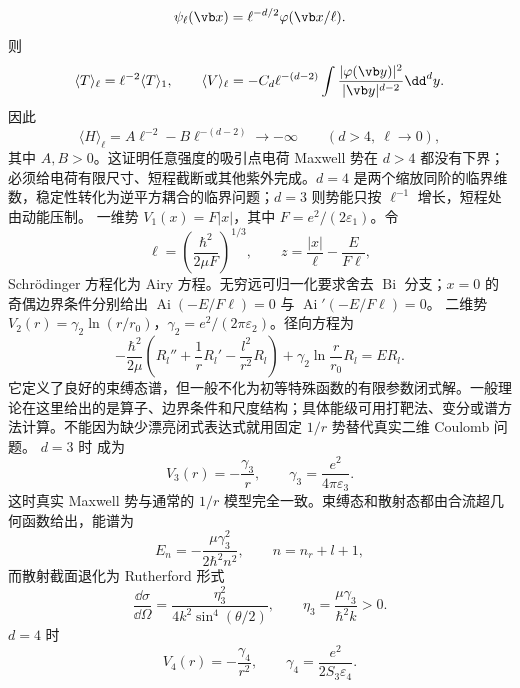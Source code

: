 \[
\psi_\ell(\vb x)=\ell^{-d/2}\varphi(\vb x/\ell).
\]
则
\[
\langle T\rangle_{\ell}=\ell^{-2}\langle T\rangle_1,
\qquad
\langle V\rangle_{\ell}=-C_d\ell^{-(d-2)}
\int\frac{|\varphi(\vb y)|^2}{|\vb y|^{d-2}}\dd^dy.
\]
因此
\begin{equation}
\langle H\rangle_\ell
=A\ell^{-2}-B\ell^{-(d-2)}\longrightarrow-\infty
\qquad(d>4,\ \ell\to0),
\label{eq:phys-hdqm-maxwell-collapse-dgt4}
\end{equation}
其中 $A,B>0$。这证明任意强度的吸引点电荷 Maxwell 势在 $d>4$ 都没有下界；必须给电荷有限尺寸、短程截断或其他紫外完成。$d=4$ 是两个缩放同阶的临界维数，稳定性转化为逆平方耦合的临界问题；$d=3$ 则势能只按 $\ell^{-1}$ 增长，短程处由动能压制。
一维势 $V_1(x)=F|x|$，其中 $F=e^2/(2\varepsilon_1)$。令
\[
 \ell=\left(\frac{\hbar^2}{2\mu F}\right)^{1/3},\qquad
 z=\frac{|x|}{\ell}-\frac{E}{F\ell},
\]
Schrödinger 方程化为 Airy 方程。无穷远可归一化要求舍去 $\operatorname{Bi}$ 分支；$x=0$ 的奇偶边界条件分别给出 $\operatorname{Ai}(-E/F\ell)=0$ 与 $\operatorname{Ai}'(-E/F\ell)=0$。
二维势 $V_2(r)=\gamma_2\ln(r/r_0)$，$\gamma_2=e^2/(2\pi\varepsilon_2)$。径向方程为
\begin{equation}\label{eq:phys-hdqm-d2-log-radial}
 -\frac{\hbar^2}{2\mu}\left(R_l''+\frac1rR_l'-\frac{l^2}{r^2}R_l\right)
 +\gamma_2\ln\frac r{r_0}R_l=ER_l.
\end{equation}
它定义了良好的束缚态谱，但一般不化为初等特殊函数的有限参数闭式解。一般理论在这里给出的是算子、边界条件和尺度结构；具体能级可用打靶法、变分或谱方法计算。不能因为缺少漂亮闭式表达式就用固定 $1/r$ 势替代真实二维 Coulomb 问题。
$d=3$ 时 成为
\begin{equation}\label{eq:phys-hdqm-coulomb-3d}
 V_3(r)=-\frac{\gamma_3}{r},\qquad \gamma_3=\frac{e^2}{4\pi\varepsilon_3}.
\end{equation}
这时真实 Maxwell 势与通常的 $1/r$ 模型完全一致。束缚态和散射态都由合流超几何函数给出，能谱为
\begin{equation}\label{eq:phys-hdqm-hydrogen-spectrum-3d}
 E_n=-\frac{\mu\gamma_3^2}{2\hbar^2n^2},\qquad n=n_r+l+1,
\end{equation}
而散射截面退化为 Rutherford 形式
\begin{equation}\label{eq:phys-hdqm-rutherford-3d}
 \frac{\dd\sigma}{\dd\Omega}=\frac{\eta_3^2}{4k^2\sin^4(\theta/2)},
 \qquad \eta_3=\frac{\mu\gamma_3}{\hbar^2k}>0.
\end{equation}
$d=4$ 时
\begin{equation}\label{eq:phys-hdqm-coulomb-4d}
 V_4(r)=-\frac{\gamma_4}{r^2},\qquad
 \gamma_4=\frac{e^2}{2S_3\varepsilon_4}.
\end{equation}
